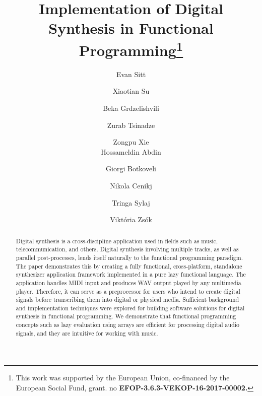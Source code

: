 \documentclass[runningheads]{llncs}
\begin{document}
%
\title{Implementation of Digital Synthesis in Functional Programming\thanks{This work was supported by the European Union, co-financed by the European Social Fund, grant. no \textbf{EFOP-3.6.3-VEKOP-16-2017-00002.}}}
%
%
\author{Evan Sitt \and Xiaotian Su \and Beka Grdzelishvili \and Zurab Tsinadze \and Zongpu Xie\\ Hossameldin Abdin \and Giorgi Botkoveli \and Nikola Cenikj \and Tringa Sylaj \and Vikt\'oria Zs\'ok \inst{\1}}
%
%

\maketitle


\begin{abstract}
Digital synthesis is a cross-discipline application used in fields such as music, telecommunication, and others. Digital synthesis involving multiple tracks, as well as parallel post-processes, lends itself naturally to the functional programming paradigm. The paper demonstrates this by creating a fully functional, cross-platform, standalone synthesizer application framework implemented in a pure lazy functional language. The application handles MIDI  input and produces WAV output played by any multimedia player.
Therefore, it can serve as a preprocessor for users who intend to create digital signals before transcribing them into digital or physical media.
Sufficient background and implementation techniques were explored for building software solutions for digital synthesis in functional programming. We demonstrate that functional programming concepts such as lazy evaluation using arrays are efficient for processing digital audio signals, and they are intuitive for working with music.

\end{abstract}
\end{document}

